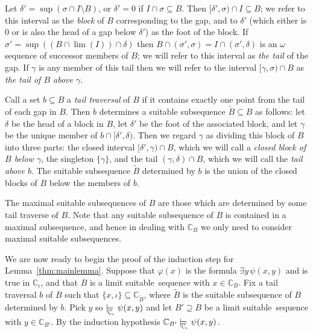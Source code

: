 \documentclass[
twoside,
]{article}
\theoremstyle{definition}
\theoremstyle{remark}
\newcommand{\modelsCi}{\models_{\!\!\!\!\!\lower.7ex\hbox{$\scriptstyle\chang_\iota$}}}\newcommand{\fvia}[4]{f^{#1}_{#2(#3)#4}}
\newcommand{\LS}{limit suitable}
\renewcommand{\phi}{\varphi}
\newcommand{\sing}[1]{\{#1\}}
\newcommand\chang{\mathbb{C}}
\begin{document}
Let $\delta'=\sup(\sigma\cap I\setminus B)$, or $\delta'=0$ if $I\cap
\sigma\subseteq B$.   Then $[\delta',\sigma)\cap I\subseteq B$; we
refer to this interval as the \emph{block} of $B$ corresponding to
the gap, and to $\delta'$ (which either is $0$ or is also the head of
a gap below $\delta'$)  as the foot of the block.  
If $\sigma'=\sup((B\cap\lim(I))\cap \delta)$ then
$B\cap(\sigma',\sigma)=I\cap(\sigma',\delta)$
is an $\omega$ sequence of successor members
of $B$; we will refer to this interval as  \emph{the tail} of the
gap.   If $\gamma$ is any member of this tail then we will refer
to the interval $[\gamma,\sigma)\cap B$ as \emph{the tail  of $B$ above $\gamma$}.

Call a set $b\subseteq B$ a \emph{tail traversal} of $B$ if it contains
exactly one point from the tail of each gap in $B$.  
Then $b$ determines a suitable subsequence $\tilde B\subseteq B$ as follows: let
$\delta$ be the head of a block in $B$, let $\delta'$ be the foot of the
associated block, and let $\gamma$ be the unique member of
$b\cap[\delta',\delta)$.   Then we regard $\gamma$ as dividing this
block of $B$ into three parts: the closed interval
$[\delta',\gamma)\cap B$, which we will call a \emph{closed block of $B$
  below $\gamma$},  
the singleton $\sing{\gamma}$, and the tail $(\gamma,\delta)\cap B$,
which we will call the \emph{tail above $b$}.
The suitable subsequence $\tilde B$ determined by $b$ is the union of
the closed blocks of $B$ below the members of $b$.

The maximal suitable subsequences of $B$ are those which are
determined by some tail traverse of $B$.    Note that any suitable
subsequence of $B$ is contained in a maximal subsequence, and hence in
dealing with $\chang_B$ we only need to consider maximal suitable subsequences.


\medskip{}
We are now ready to begin the proof of  the induction step for Lemma~\ref{thm:mainlemma}.
Suppose that $\phi(x)$ is the formula $\exists y\,\psi(x,y)$ and
is true in $\chang_{\iota}$, and that $B$ is a \LS\ sequence with
$x\in \chang_B$. 
Fix a tail traversal $b$ of $B$ such that
$\sing{x,\iota}\subseteq\chang_{\tilde B}$, 
where $\tilde B$ is the suitable subsequence of $B$ determined by $b$.
Pick $y$ so $\modelsCi\psi(x,y)$ and let $B'\supseteq B$ be a
\LS\ sequence with $y\in \chang_{B'}$.   By the induction hypothesis
$\chang_{B'}\modelsCi\psi(x,y)$.
\end{document}
